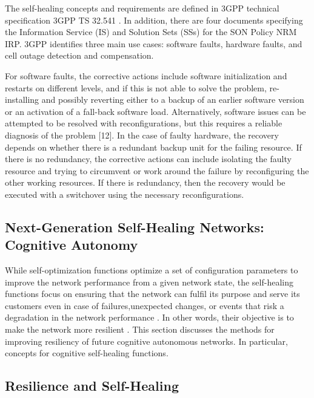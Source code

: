 The self-healing concepts and requirements are defined in 3GPP technical specification 3GPP TS 32.541 \cite{3gpp2014telecommunication}. In addition, there are four documents specifying the Information Service (IS) and Solution Sets (SSs) for the SON Policy NRM IRP. 3GPP identifies three main use cases: software faults, hardware faults, and cell outage detection and compensation.


For software faults, the corrective actions include software initialization and restarts on different levels, and if this is not able to solve the problem, re-installing and possibly reverting either to a backup of an earlier software version or an activation of a fall-back software load. Alternatively, software issues can be attempted to be resolved with reconfigurations, but this requires a reliable diagnosis of the problem [12]. In the case of faulty hardware, the recovery depends on whether there is a redundant backup unit for the failing resource. If there is no redundancy, the corrective actions can include isolating the faulty resource and trying to circumvent or work around the failure by reconfiguring the other working resources. If there is redundancy, then the recovery would be executed with a switchover using the necessary reconfigurations.

\subsection{Next-Generation Self-Healing Networks: Cognitive Autonomy}

While self-optimization functions optimize a set of configuration parameters to improve the network performance from a given network state, the self-healing functions focus on ensuring that the network can fulfil its purpose and serve its customers even in case of failures,unexpected changes, or events that risk a degradation in the network performance \cite{sartori2012self}. In other words, their objective is to make the network more resilient \cite{zolli2012resilience,mwanje2016network}. This section discusses the methods for improving resiliency of future cognitive autonomous networks. In particular, concepts for cognitive self-healing functions.

\subsection{Resilience and Self-Healing}


